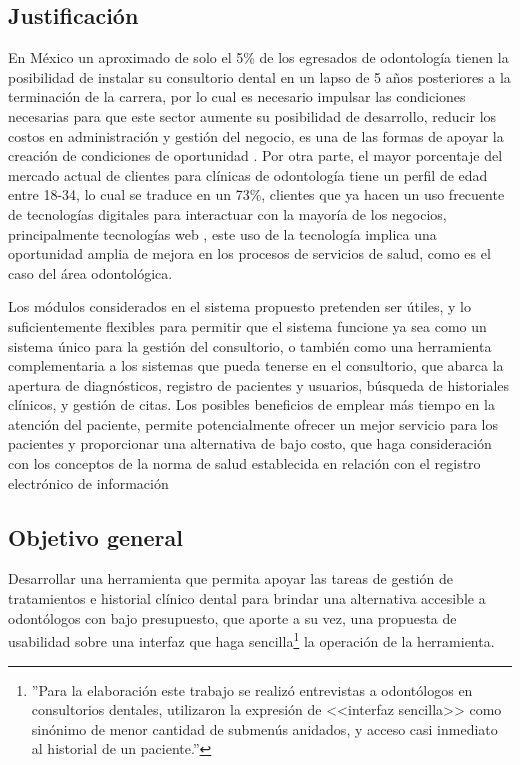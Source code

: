 \subsection{Justificación}
En México un aproximado de solo el 5\% de los egresados de odontología tienen la posibilidad de instalar su consultorio dental en un lapso de 5 años posteriores a la terminación de la carrera, por lo cual es necesario impulsar las condiciones necesarias para que este sector aumente su posibilidad de desarrollo, reducir los costos en administración y gestión del negocio, es una de las formas de apoyar la creación de condiciones de oportunidad \cite{D01}.  Por otra parte, el mayor porcentaje del mercado actual de clientes para clínicas de odontología tiene un perfil de edad entre 18-34, lo cual se traduce en un 73\%, clientes que ya hacen un uso frecuente de tecnologías digitales para interactuar con la mayoría de los negocios, principalmente tecnologías web \cite{D02}, este uso de la tecnología implica una oportunidad amplia de mejora en los procesos de servicios de salud, como es el caso del área odontológica.


\vspace{1em}

Los módulos considerados en el sistema propuesto pretenden ser útiles, y lo suficientemente flexibles para permitir que el sistema funcione ya sea como un sistema único para la gestión del consultorio, o también como una herramienta complementaria a los sistemas que pueda tenerse en el consultorio, que abarca la apertura de diagnósticos, registro de pacientes y usuarios, búsqueda de historiales clínicos, y gestión de citas. Los posibles beneficios de emplear más tiempo en la atención del paciente, permite potencialmente ofrecer un mejor servicio para los pacientes y proporcionar una alternativa de bajo costo, que haga consideración con los conceptos de la norma de salud establecida en relación con el registro electrónico de información


\subsection{Objetivo general}

Desarrollar una herramienta que permita apoyar las tareas de gestión de tratamientos e historial clínico dental para brindar una alternativa accesible a odontólogos con bajo presupuesto, que aporte a su vez, una propuesta de usabilidad sobre una interfaz que haga sencilla\footnote{''Para la elaboración este trabajo se realizó entrevistas a odontólogos en consultorios dentales, utilizaron la expresión de <<interfaz sencilla>> como sinónimo de menor cantidad de submenús anidados, y acceso casi inmediato al historial de un paciente.''} la operación de la herramienta.


